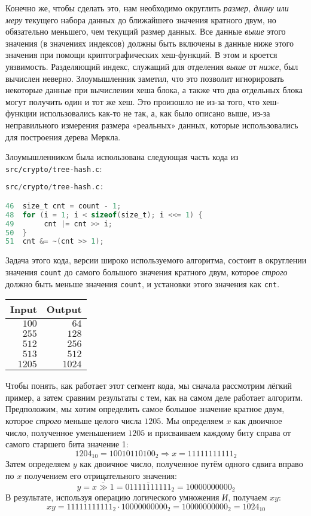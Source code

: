 \documentclass{mrl}
\begin{document}
Конечно же, чтобы сделать это, нам необходимо округлить \emph{размер, длину или меру} текущего набора данных до ближайшего значения кратного двум, но обязательно меньшего, чем текущий размер данных. Все данные \emph{выше} этого значения (в значениях индексов) должны быть включены в данные ниже этого значения при помощи криптографических хеш-функций. В этом и кроется уязвимость. Разделяющий индекс, служащий для отделения \emph{выше} от \emph{ниже}, был вычислен неверно. Злоумышленник заметил, что это позволит игнорировать некоторые данные при вычислении хеша блока, а также что два отдельных блока могут получить один и тот же хеш. Это произошло не из-за того, что хеш-функции использовались как-то не так, а, как было описано выше, из-за неправильного измерения размера «реальных» данных, которые использовались для построения дерева Меркла.

Злоумышленником была использована следующая часть кода из \texttt{src/crypto/tree-hash.c}:

\begin{lstlisting}[language=C]
src/crypto/tree-hash.c:

46  size_t cnt = count - 1;
48  for (i = 1; i < sizeof(size_t); i <<= 1) {
49       cnt |= cnt >> i;
50  }
51  cnt &= ~(cnt >> 1);

\end{lstlisting}

Задача этого кода, версии широко используемого алгоритма, состоит в округлении значения \texttt{count} до самого большого значения кратного двум, которое \emph{строго} должно быть меньше значения \texttt{count}, и установки этого значения как \texttt{cnt}\cite{viega2003secure}.
\begin{center}
\begin{tabular}{r|r}
Input & Output \\
\hline
$100$ & $64$ \\
$255$ & $128$ \\
$512$ & $256$ \\
$513$ & $512$ \\
$1205$ & $1024$
\end{tabular}
\end{center}
Чтобы понять, как работает этот сегмент кода, мы сначала рассмотрим лёгкий пример, а затем сравним результаты с тем, как на самом деле работает алгоритм. Предположим, мы хотим определить самое большое значение кратное двум, которое \emph{строго} меньше целого числа $1205$. Мы определяем $x$ как двоичное число, полученное уменьшением $1205$ и присваиваем каждому биту справа от самого старшего бита значение 1:
$$1204_{10} = 10010110100_2 \Rightarrow x = 11111111111_2$$
Затем определяем $y$ как двоичное число, полученное путём одного сдвига вправо по $x$ получением его отрицательного значения:
$$y = \overline{x \gg 1} = \overline{01111111111}_2 = 10000000000_2$$
В результате, используя операцию логического умножения {\it И}, получаем $xy$:
$$xy = 11111111111_2 \cdot 10000000000_2 = 10000000000_2 = 1024_{10}$$
\end{document}
